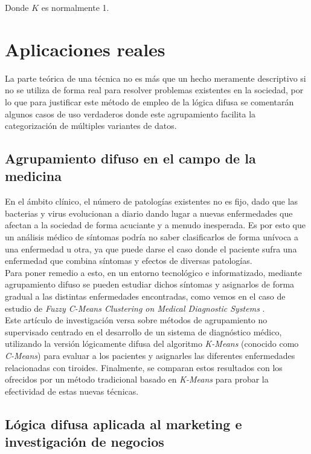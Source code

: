 \documentclass[]{report}
\begin{document}
		Donde $K$ es normalmente 1.
		
	\chapter{Aplicaciones reales}
	
		La parte teórica de una técnica no es más que un hecho meramente descriptivo si no se utiliza de forma real para resolver problemas existentes en la sociedad, por lo que para justificar este método de empleo de la lógica difusa se comentarán algunos casos de uso verdaderos donde este agrupamiento facilita la categorización de múltiples variantes de datos.\\
		
		\section{Agrupamiento difuso en el campo de la medicina}
		
			En el ámbito clínico, el número de patologías existentes no es fijo, dado que las bacterias y virus evolucionan a diario dando lugar a nuevas enfermedades que afectan a la sociedad de forma acuciante y a menudo inesperada. Es por esto que un análisis médico de síntomas podría no saber clasificarlos de forma unívoca a una enfermedad u otra, ya que puede darse el caso donde el paciente sufra una enfermedad que combina síntomas y efectos de diversas patologías.\\
			
			Para poner remedio a esto, en un entorno tecnológico e informatizado, mediante agrupamiento difuso se pueden estudiar dichos síntomas y asignarlos de forma gradual a las distintas enfermedades encontradas, como vemos en el caso de estudio de \textit{Fuzzy C-Means Clustering on Medical Diagnostic Systems} \cite{medicine}.\\
			
			Este artículo de investigación versa sobre métodos de agrupamiento no supervisado centrado en el desarrollo de un sistema de diagnóstico médico, utilizando la versión lógicamente difusa del algoritmo \textit{K-Means} (conocido como \textit{C-Means}) para evaluar a los pacientes y asignarles las diferentes enfermedades relacionadas con tiroides. Finalmente, se comparan estos resultados con los ofrecidos por un método tradicional basado en \textit{K-Means} para probar la efectividad de estas nuevas técnicas.
			
		\section{Lógica difusa aplicada al marketing e investigación de negocios}
		
\end{document}
